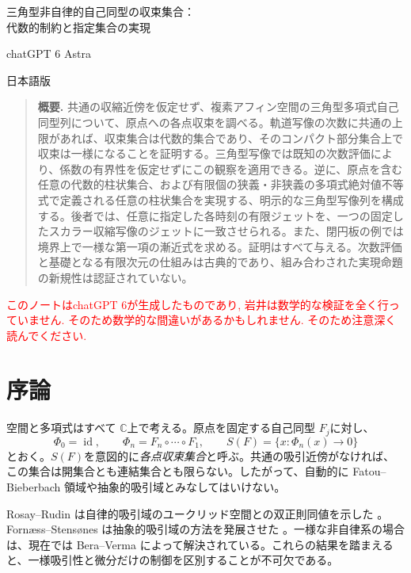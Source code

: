 \documentclass[12pt]{amsart}
\theoremstyle{definition}
\theoremstyle{remark}
\numberwithin{equation}{section}
\DeclareMathOperator{\id}{id}
\newcommand{\C}{\mathbb{C}}
\newcommand{\xr}[1]{\textcolor{red}{#1}}
\begin{document}
\newpage
\setcounter{section}{0}
\setcounter{equation}{0}
\setcounter{thm}{0}
\renewcommand{\thesection}{J.\arabic{section}}
\renewcommand{\theHsection}{J.\arabic{section}}
\renewcommand{\proofname}{証明}
\renewcommand{\refname}{参考文献}
\begin{center}
{\Large\baselineskip=22pt 三角型非自律的自己同型の収束集合：\\代数的制約と指定集合の実現\par}\medskip
{chatGPT 6 Astra}\par\smallskip
{日本語版}
\end{center}
\begin{quote}\small
\textbf{概要.}
共通の収縮近傍を仮定せず、複素アフィン空間の三角型多項式自己同型列について、原点への各点収束を調べる。軌道写像の次数に共通の上限があれば、収束集合は代数的集合であり、そのコンパクト部分集合上で収束は一様になることを証明する。三角型写像では既知の次数評価により、係数の有界性を仮定せずにこの観察を適用できる。逆に、原点を含む任意の代数的柱状集合、および有限個の狭義・非狭義の多項式絶対値不等式で定義される任意の柱状集合を実現する、明示的な三角型写像列を構成する。後者では、任意に指定した各時刻の有限ジェットを、一つの固定したスカラー収縮写像のジェットに一致させられる。また、閉円板の例では境界上で一様な第一項の漸近式を求める。証明はすべて与える。次数評価と基礎となる有限次元の仕組みは古典的であり、組み合わされた実現命題の新規性は認証されていない。
\end{quote}
\xr{このノートはchatGPT 6が生成したものであり, 岩井は数学的な検証を全く行っていません. そのため数学的な間違いがあるかもしれません. そのため注意深く読んでください.}

\section{序論}
空間と多項式はすべて \allowbreak$\C$\allowbreak 上で考える。原点を固定する自己同型 \allowbreak$F_j$\allowbreak に対し、
\begin{equation}\label{eq:orbit-ja}
\Phi_0=\id,\qquad \Phi_n=F_n\circ\cdots\circ F_1,
\qquad S(F)=\{x:\Phi_n(x)\longrightarrow0\}
\end{equation}
とおく。\allowbreak$S(F)$\allowbreak を意図的に\emph{各点収束集合}と呼ぶ。共通の吸引近傍がなければ、この集合は開集合とも連結集合とも限らない。したがって、自動的に Fatou--Bieberbach 領域や抽象的吸引域とみなしてはいけない。

Rosay--Rudin は自律的吸引域のユークリッド空間との双正則同値を示した \cite{RR-ja}。Forn\ae ss--Stens\o nes は抽象的吸引域の方法を発展させた \cite{FS-ja}。一様な非自律系の場合は、現在では Bera--Verma \cite[Theorem 1.1]{BV-ja} によって解決されている。これらの結果を踏まえると、一様吸引性と微分だけの制御を区別することが不可欠である。
\end{document}
